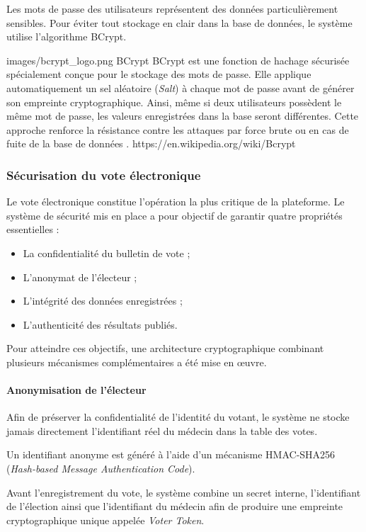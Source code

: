 ﻿\documentclass[12pt,a4paper]{report}
\begin{document}
Les mots de passe des utilisateurs représentent des données particulièrement
sensibles. Pour éviter tout stockage en clair dans la base de données, le
système utilise l’algorithme BCrypt.

\techno
{images/bcrypt_logo.png}
{BCrypt}
{BCrypt est une fonction de hachage sécurisée spécialement conçue pour le
stockage des mots de passe. Elle applique automatiquement un sel aléatoire
(\textit{Salt}) à chaque mot de passe avant de générer son empreinte
cryptographique. Ainsi, même si deux utilisateurs possèdent le même mot de
passe, les valeurs enregistrées dans la base seront différentes. Cette approche
renforce la résistance contre les attaques par force brute ou en cas de fuite
de la base de données \cite{bcryptPaper}.}
{https://en.wikipedia.org/wiki/Bcrypt}

\subsubsection{Sécurisation du vote électronique}

Le vote électronique constitue l’opération la plus critique de la plateforme.
Le système de sécurité mis en place a pour objectif de garantir quatre
propriétés essentielles :

\begin{itemize}
\item La confidentialité du bulletin de vote ;
\item L’anonymat de l’électeur ;
\item L’intégrité des données enregistrées ;
\item L’authenticité des résultats publiés.
\end{itemize}

Pour atteindre ces objectifs, une architecture cryptographique combinant
plusieurs mécanismes complémentaires a été mise en œuvre.

\paragraph{Anonymisation de l’électeur}\mbox{}

Afin de préserver la confidentialité de l’identité du votant, le système ne
stocke jamais directement l’identifiant réel du médecin dans la table des votes.

Un identifiant anonyme est généré à l’aide d’un mécanisme HMAC-SHA256
(\textit{Hash-based Message Authentication Code}).

Avant l’enregistrement du vote, le système combine un secret interne, l’identifiant
de l’élection ainsi que l’identifiant du médecin afin de produire une empreinte
cryptographique unique appelée \textit{Voter Token}.
\end{document}
